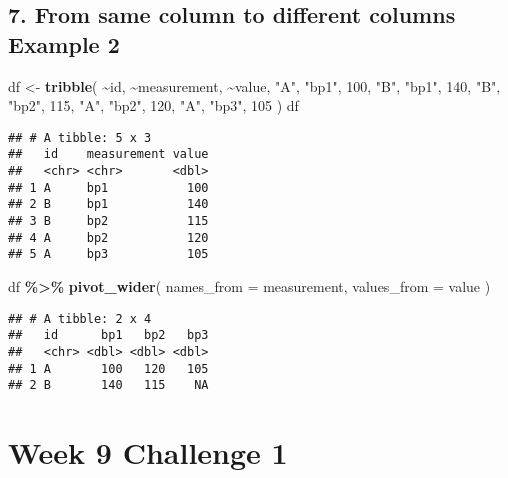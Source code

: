 \documentclass[
]{article}
\newenvironment{Shaded}{\begin{snugshade}}{\end{snugshade}}
\newcommand{\AttributeTok}[1]{\textcolor[rgb]{0.13,0.29,0.53}{#1}}
\newcommand{\DecValTok}[1]{\textcolor[rgb]{0.00,0.00,0.81}{#1}}
\newcommand{\FunctionTok}[1]{\textcolor[rgb]{0.13,0.29,0.53}{\textbf{#1}}}
\newcommand{\NormalTok}[1]{#1}
\newcommand{\OtherTok}[1]{\textcolor[rgb]{0.56,0.35,0.01}{#1}}
\newcommand{\SpecialCharTok}[1]{\textcolor[rgb]{0.81,0.36,0.00}{\textbf{#1}}}
\newcommand{\StringTok}[1]{\textcolor[rgb]{0.31,0.60,0.02}{#1}}
\begin{document}
\hypertarget{from-same-column-to-different-columns-example-2}{%
\subsection{7. From same column to different columns Example
2}\label{from-same-column-to-different-columns-example-2}}

\begin{Shaded}
\begin{Highlighting}[]
\NormalTok{df }\OtherTok{\textless{}{-}} \FunctionTok{tribble}\NormalTok{(}
\SpecialCharTok{\textasciitilde{}}\NormalTok{id, }\SpecialCharTok{\textasciitilde{}}\NormalTok{measurement, }\SpecialCharTok{\textasciitilde{}}\NormalTok{value,}
\StringTok{"A"}\NormalTok{, }\StringTok{"bp1"}\NormalTok{, }\DecValTok{100}\NormalTok{,}
\StringTok{"B"}\NormalTok{, }\StringTok{"bp1"}\NormalTok{, }\DecValTok{140}\NormalTok{,}
\StringTok{"B"}\NormalTok{, }\StringTok{"bp2"}\NormalTok{, }\DecValTok{115}\NormalTok{,}
\StringTok{"A"}\NormalTok{, }\StringTok{"bp2"}\NormalTok{, }\DecValTok{120}\NormalTok{,}
\StringTok{"A"}\NormalTok{, }\StringTok{"bp3"}\NormalTok{, }\DecValTok{105}
\NormalTok{)}
\NormalTok{df}
\end{Highlighting}
\end{Shaded}

\begin{verbatim}
## # A tibble: 5 x 3
##   id    measurement value
##   <chr> <chr>       <dbl>
## 1 A     bp1           100
## 2 B     bp1           140
## 3 B     bp2           115
## 4 A     bp2           120
## 5 A     bp3           105
\end{verbatim}

\begin{Shaded}
\begin{Highlighting}[]
\NormalTok{df }\SpecialCharTok{\%\textgreater{}\%}
\FunctionTok{pivot\_wider}\NormalTok{(}
\AttributeTok{names\_from =}\NormalTok{ measurement,}
\AttributeTok{values\_from =}\NormalTok{ value}
\NormalTok{)}
\end{Highlighting}
\end{Shaded}

\begin{verbatim}
## # A tibble: 2 x 4
##   id      bp1   bp2   bp3
##   <chr> <dbl> <dbl> <dbl>
## 1 A       100   120   105
## 2 B       140   115    NA
\end{verbatim}

\hypertarget{week-9-challenge-1}{%
\section{Week 9 Challenge 1}\label{week-9-challenge-1}}
\end{document}
